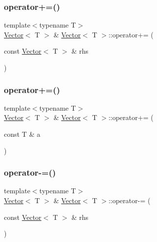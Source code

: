 \subsubsection{\texorpdfstring{operator+=()}{operator+=()}\hspace{0.1cm}{\footnotesize\ttfamily [1/2]}}
{\footnotesize\ttfamily template$<$typename T$>$ \\
\mbox{\hyperlink{classVector}{Vector}}$<$ T $>$ \& \mbox{\hyperlink{classVector}{Vector}}$<$ T $>$\+::operator+= (\begin{DoxyParamCaption}\item[{const \mbox{\hyperlink{classVector}{Vector}}$<$ T $>$ \&}]{rhs }\end{DoxyParamCaption})\hspace{0.3cm}{\ttfamily [inline]}}

\mbox{\label{classVector_a5650df0775f0677f76259cd3f474dded}} 
\subsubsection{\texorpdfstring{operator+=()}{operator+=()}\hspace{0.1cm}{\footnotesize\ttfamily [2/2]}}
{\footnotesize\ttfamily template$<$typename T$>$ \\
\mbox{\hyperlink{classVector}{Vector}}$<$ T $>$ \& \mbox{\hyperlink{classVector}{Vector}}$<$ T $>$\+::operator+= (\begin{DoxyParamCaption}\item[{const T \&}]{a }\end{DoxyParamCaption})\hspace{0.3cm}{\ttfamily [inline]}}

\mbox{\label{classVector_ab5ed11e19503bbc0ee10c7a8d1ee2978}} 
\subsubsection{\texorpdfstring{operator-\/=()}{operator-=()}\hspace{0.1cm}{\footnotesize\ttfamily [1/2]}}
{\footnotesize\ttfamily template$<$typename T$>$ \\
\mbox{\hyperlink{classVector}{Vector}}$<$ T $>$ \& \mbox{\hyperlink{classVector}{Vector}}$<$ T $>$\+::operator-\/= (\begin{DoxyParamCaption}\item[{const \mbox{\hyperlink{classVector}{Vector}}$<$ T $>$ \&}]{rhs }\end{DoxyParamCaption})\hspace{0.3cm}{\ttfamily [inline]}}

